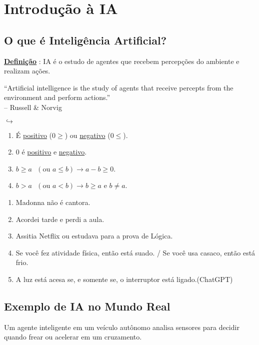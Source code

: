 \section{Introdução à IA}

\subsection{O que é Inteligência Artificial?}
\begin{conceptbox}
\underline{\underline{\textbf{Definição}}} : IA é o estudo de agentes que recebem percepções do ambiente e realizam ações.
\end{conceptbox}

\begin{quotebox}
“Artificial intelligence is the study of agents that receive percepts from the environment and perform actions.”\\
\hfill -- Russell \& Norvig
\end{quotebox}

$\hookrightarrow$

\begin{enumerate}
    \item É \underline{positivo} ($0 \geq $) ou \underline{negativo} ($0 \leq$).
    \item $0$ é \underline{positivo} e \underline{negativo}.
    \item $b \geq a \text{ }(\text{ou } a \leq b) \rightarrow a-b \geq 0$.
    \item $b > a \text{ }(\text{ou }  a < b) \rightarrow b \geq a \text{ e } b \ne a$.
\end{enumerate}

\begin{enumerate}[label=(\roman*)]
        \item Madonna não é cantora.
        \item Acordei tarde e perdi a aula.
        \item Assitia Netflix ou estudava para a prova de Lógica.
        \item Se você fez atividade física, então está suado. / Se você usa casaco, então está frio.
        \item A luz está acesa se, e somente se, o interruptor está ligado.(ChatGPT)
\end{enumerate} 



\subsection{Exemplo de IA no Mundo Real}
\begin{examplebox}
Um agente inteligente em um veículo autônomo analisa sensores para decidir quando frear ou acelerar em um cruzamento.
\end{examplebox}

